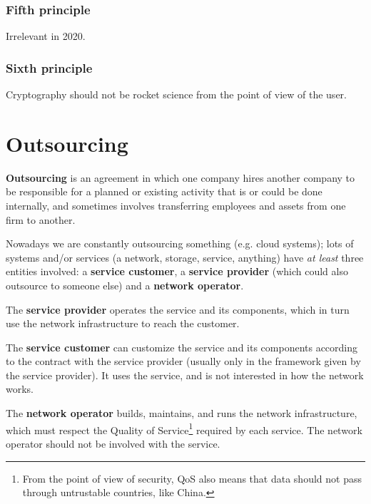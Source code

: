 
\subsubsection*{Fifth principle}
Irrelevant in 2020.


\subsubsection*{Sixth principle}
Cryptography should not be rocket science from the point of view of the user.


\section{Outsourcing}
\textbf{Outsourcing} is an agreement in which one company hires another company to be responsible for a planned or existing activity that is or could be done internally, and sometimes involves transferring employees and assets from one firm to another. 

Nowadays we are constantly outsourcing something (e.g. cloud systems); lots of systems and/or services (a network, storage, service, anything) have \textit{at least} three entities involved: a \textbf{service customer}, a \textbf{service provider} (which could also outsource to someone else) and a \textbf{network operator}.

The \textbf{service provider} operates the service and its components, which in turn use the network infrastructure to reach the customer.

The \textbf{service customer} can customize the service and its components according to the contract with the service provider (usually only in the framework given by the service provider). It uses the service, and is not interested in how the network works.

The \textbf{network operator} builds, maintains, and runs the network infrastructure, which must respect the Quality of Service\footnote{From the point of view of security, QoS also means that data should not pass through untrustable countries, like China.} required by each service. The network operator should not be involved with the service.


